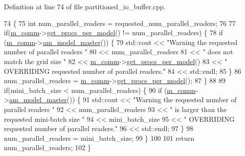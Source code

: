 Definition at line 74 of file partitioned\+\_\+io\+\_\+buffer.\+cpp.


\begin{DoxyCode}
74                                                                                                            
                                             \{
75   \textcolor{keywordtype}{int} num\_parallel\_readers = requested\_num\_parallel\_readers;
76 
77   \textcolor{keywordflow}{if}(\hyperlink{classlbann_1_1generic__io__buffer_a2e4a46c85c8b30e10b1cc5acaa2c4cca}{m\_comm}->\hyperlink{classlbann_1_1lbann__comm_a5755dfdfc6377b4cae5ef8f7819e17de}{get\_procs\_per\_model}() != num\_parallel\_readers) \{
78     \textcolor{keywordflow}{if} (\hyperlink{classlbann_1_1generic__io__buffer_a2e4a46c85c8b30e10b1cc5acaa2c4cca}{m\_comm}->\hyperlink{classlbann_1_1lbann__comm_ad8a5790dfa9191d4b4f889e8707e57f1}{am\_model\_master}()) \{
79       std::cout << \textcolor{stringliteral}{"Warning the requested number of parallel readers "}
80                 << num\_parallel\_readers
81                 << \textcolor{stringliteral}{" does not match the grid size "}
82                 << \hyperlink{classlbann_1_1generic__io__buffer_a2e4a46c85c8b30e10b1cc5acaa2c4cca}{m\_comm}->\hyperlink{classlbann_1_1lbann__comm_a5755dfdfc6377b4cae5ef8f7819e17de}{get\_procs\_per\_model}()
83                 << \textcolor{stringliteral}{" OVERRIDING requested number of parallel readers."}
84                 << std::endl;
85     \}
86     num\_parallel\_readers = \hyperlink{classlbann_1_1generic__io__buffer_a2e4a46c85c8b30e10b1cc5acaa2c4cca}{m\_comm}->\hyperlink{classlbann_1_1lbann__comm_a5755dfdfc6377b4cae5ef8f7819e17de}{get\_procs\_per\_model}();
87   \}
88 
89   \textcolor{keywordflow}{if}(mini\_batch\_size < num\_parallel\_readers) \{
90     \textcolor{keywordflow}{if} (\hyperlink{classlbann_1_1generic__io__buffer_a2e4a46c85c8b30e10b1cc5acaa2c4cca}{m\_comm}->\hyperlink{classlbann_1_1lbann__comm_ad8a5790dfa9191d4b4f889e8707e57f1}{am\_model\_master}()) \{
91       std::cout << \textcolor{stringliteral}{"Warning the requested number of parallel readers "}
92                 << num\_parallel\_readers
93                 << \textcolor{stringliteral}{" is larger than the requested mini-batch size "}
94                 << mini\_batch\_size
95                 << \textcolor{stringliteral}{" OVERRIDING requested number of parallel readers."}
96                 << std::endl;
97     \}
98     num\_parallel\_readers = mini\_batch\_size;
99   \}
100 
101   \textcolor{keywordflow}{return} num\_parallel\_readers;
102 \}
\end{DoxyCode}
